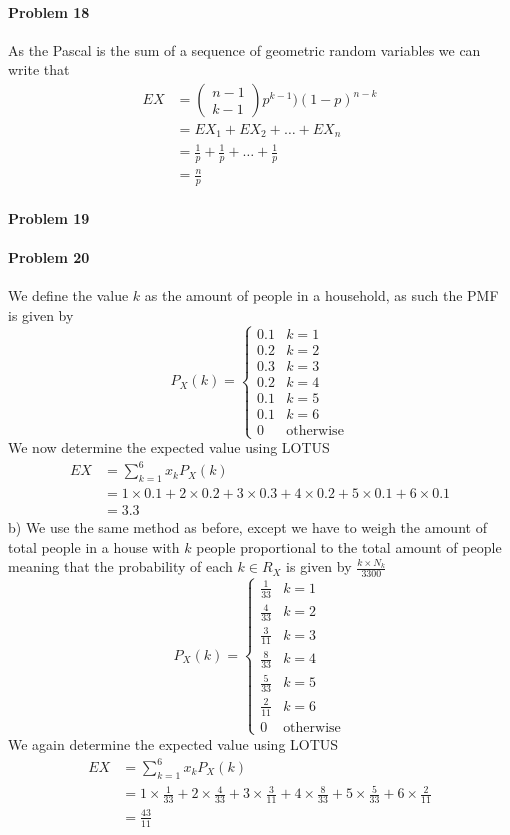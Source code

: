 \paragraph{Problem 18}
As the Pascal is the sum of a sequence of geometric random variables we can write that
\begin{align*}
    EX&=\begin{pmatrix}n-1\\k-1\end{pmatrix}p^{k-1})(1-p)^{n-k} \\
      &=EX_{1}+EX_{2}+\ldots+EX_{n} \\
      &=\frac{1}{p}+\frac{1}{p}+\ldots+\frac{1}{p} \\
      &=\frac{n}{p}
\end{align*}
\paragraph{Problem 19}
\paragraph{Problem 20}
We define the value $k$ as the amount of people in a household, as such the PMF is given by
\[
    P_{X}(k)=\begin{cases}0.1 & k=1 \\ 0.2 & k=2 \\ 0.3 & k=3 \\ 0.2 & k=4 \\ 0.1 & k=5 \\ 0.1 & k=6 \\ 0 & \text{otherwise}\end{cases}
\]
We now determine the expected value using LOTUS
\begin{align*}
    EX&=\sum_{k=1}^{6}x_{k}P_{X}(k) \\
      &=1\times0.1+2\times0.2+3\times0.3+4\times0.2+5\times0.1+6\times0.1 \\
      &=3.3
\end{align*}
b)
We use the same method as before, except we have to weigh the amount of total people in a house with $k$ people proportional to the total amount of people meaning that the probability of each $k\in R_{X}$ is given by $\frac{k\times N_{k}}{3300}$
\[
    P_{X}(k)=\begin{cases}\frac{1}{33} & k=1 \\ \frac{4}{33} & k=2 \\ \frac{3}{11} & k=3 \\ \frac{8}{33} & k=4 \\ \frac{5}{33} & k=5 \\ \frac{2}{11} & k=6 \\ 0 & \text{otherwise}\end{cases}
\]
We again determine the expected value using LOTUS
\begin{align*}
    EX&=\sum_{k=1}^{6}x_{k}P_{X}(k) \\
      &=1\times\frac{1}{33}+2\times\frac{4}{33}+3\times\frac{3}{11}+4\times\frac{8}{33}+5\times\frac{5}{33}+6\times\frac{2}{11} \\
      &=\frac{43}{11}
\end{align*}

